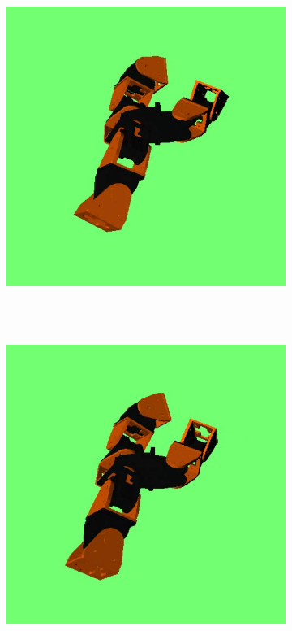 \begin{figure}[h]
\begin{subfigure}[b]{0.18\textwidth}
                 \\~
        \end{subfigure}
        ~
        \begin{subfigure}[b]{0.18\textwidth}
         	   \centering
                \includegraphics[width=\textwidth]{images/results_7_gait_03.png}
                 \\~
        \end{subfigure}
        ~
        \begin{subfigure}[b]{0.18\textwidth}
         	   \centering
                \includegraphics[width=\textwidth]{images/results_7_gait_04.png}

\end{subfigure}
\end{figure}
